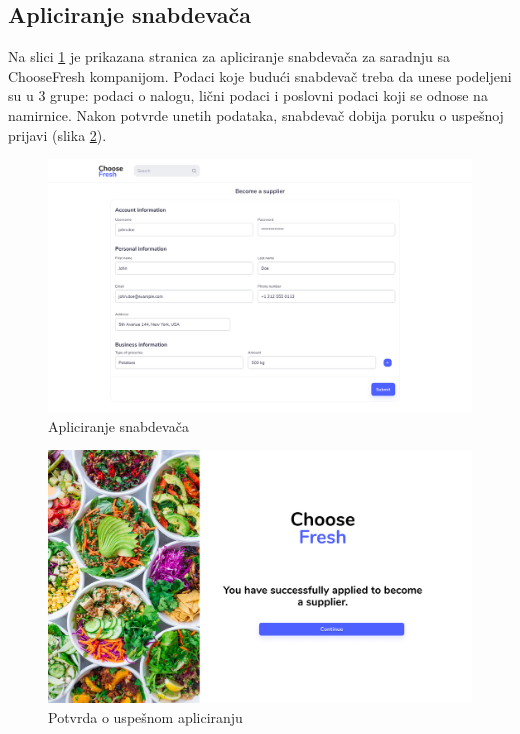 \subsection{Apliciranje snabdevača}

Na slici \ref{fig:SupplierApplicationScreen1} je prikazana stranica za apliciranje snabdevača za saradnju sa ChooseFresh kompanijom. Podaci koje budući snabdevač treba da unese podeljeni su u 3 grupe: podaci o nalogu, lični podaci i poslovni podaci koji se odnose na namirnice.
Nakon potvrde unetih podataka, snabdevač dobija poruku o uspešnoj prijavi (slika \ref{fig:SupplierApplicationScreen2}).

\begin{figure}[H]
    \begin{center}
        \includegraphics[width=\textwidth]{UI/Supplier Application (Screen 1).png}
            \caption{Apliciranje snabdevača}
    \label{fig:SupplierApplicationScreen1}
    \end{center}
\end{figure}

\begin{figure}[H]
    \begin{center}
        \includegraphics[width=\textwidth]{UI/Supplier Application (Screen 2).png}
            \caption{Potvrda o uspešnom apliciranju}
    \label{fig:SupplierApplicationScreen2}
    \end{center}
\end{figure}
